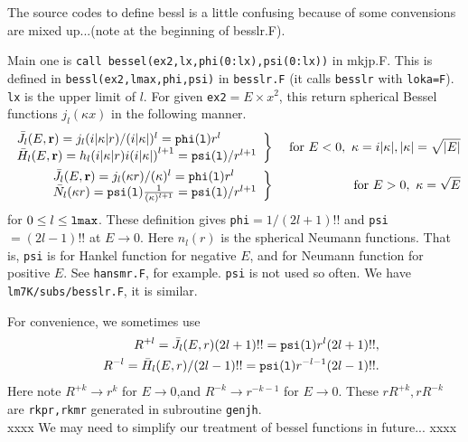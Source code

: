\documentclass[a4paper,10pt,fleqn]{article}
\newcommand{\bfr}{{\bf r}}
\begin{document}
The source codes to define bessl is a little confusing because
of some convensions are mixed up...(note at the beginning of besslr.F).

Main one is \verb#call bessel(ex2,lx,phi(0:lx),psi(0:lx))# in mkjp.F.
This is defined in \verb#bessl(ex2,lmax,phi,psi)# in \verb#besslr.F# 
(it calls \verb#besslr# with \verb#loka=F#).
\verb!lx! is the upper limit of $l$.
For given \verb#ex2#$=E\times x^2$,
this return spherical Bessel functions $j_l(\kappa x)$
in the following manner. 
\begin{eqnarray}
\left.
\begin{array}{ll}
\bar{J}_l(E,\bfr)=j_l(i|\kappa|r)/(i|\kappa|)^l={\tt phi(l)}r^l\\
\bar{H}_l(E,\bfr)=h_l(i|\kappa|r){i (i|\kappa|)}^{l+1}={\tt psi(l)}/r^{l+1} 
\end{array}
\right\}&& \ {\rm for}\ E<0, \ \kappa=i|\kappa|,
|\kappa|=\sqrt{|E|} \nonumber \\
\left.
\begin{array}{ll}
\bar{J}_l(E,\bfr)=j_l(\kappa r)/(\kappa )^l = {\tt phi(l)}r^l  \\
\bar{N}_l(\kappa r) = {\tt psi(l)}\frac{1}{(\kappa)^{l+1}}={\tt psi(l)}/r^{l+1}
\end{array} 
\right\}&& \ {\rm for}\ E>0, \ \kappa=\sqrt{E}
\label{eq:jhpp2} 
\end{eqnarray}
for $0\le l \le{\tt lmax}$. These definition gives \verb#phi#$=1/(2l+1)!!$
and \verb#psi#$=(2l-1)!!$ at $E \to 0$. 
Here $n_l(r)$ is the spherical Neumann functions.
That is, \verb!psi! is for Hankel function 
for negative $E$, and for Neumann function for positive $E$. 
See \verb#hansmr.F#, for example. \verb!psi! is not used so often.
We have \verb!lm7K/subs/besslr.F!, it is similar.

For convenience, we sometimes use 
\begin{eqnarray}
&&R^{+l}=\bar{J}_l(E,r)(2l+1)!!={\tt psi(l)}r^l(2l+1)!!,  \nonumber \\
&&R^{-l}=\bar{H}_l(E,r)/(2l-1)!!={\tt psi(l)}r^{-l-1}(2l-1)!!.
\label{eq:defrp}
\end{eqnarray}
Here note $R^{+k} \rightarrow r^k$ for $E\to 0$,and 
$R^{-k} \rightarrow r^{-k-1}$ for $E\to 0$.
These $rR^{+k},rR^{-k}$ are \verb#rkpr,rkmr# generated in subroutine \verb#genjh#. \\


xxxx We may need to simplify our treatment of bessel functions in
future... xxxx
\end{document}
